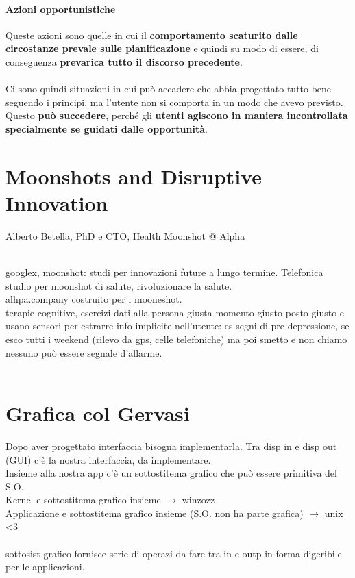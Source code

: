 \documentclass[10pt]{article}
\begin{document}
\paragraph{Azioni opportunistiche} Queste azioni sono quelle in cui il \textbf{comportamento scaturito dalle circostanze prevale sulle pianificazione} e quindi su modo di essere, di conseguenza \textbf{prevarica tutto il discorso precedente}.\\\\Ci sono quindi situazioni in cui può accadere che abbia progettato tutto bene seguendo i principi, ma l'utente non si comporta in un modo che avevo previsto. Questo \textbf{può succedere}, perché gli \textbf{utenti agiscono in maniera incontrollata specialmente se guidati dalle opportunità}.
\section{Moonshots and Disruptive Innovation}
\begin{scriptsize}
Alberto Betella, PhD e CTO, Health Moonshot @ Alpha\\\\
\end{scriptsize}
googlex, moonshot: studi per innovazioni future a lungo termine. Telefonica studio per moonshot di salute, rivoluzionare la salute.\\
alhpa.company costruito per i mooneshot.\\
terapie cognitive, esercizi dati alla persona giusta momento giusto posto giusto e usano sensori per estrarre info implicite nell'utente: es segni di pre-depressione, se esco tutti i weekend (rilevo da gps, celle telefoniche) ma poi smetto e non chiamo nessuno può essere segnale d'allarme.\\\\
\section{Grafica col Gervasi}
Dopo aver progettato interfaccia bisogna implementarla. Tra disp in e disp out (GUI) c'è la nostra interfaccia, da implementare.\\
Insieme alla nostra app c'è un sottostitema grafico che può essere primitiva del S.O.\\
Kernel e sottostitema grafico insieme $\rightarrow$ winzozz\\
Applicazione e sottostitema grafico insieme (S.O. non ha parte grafica) $\rightarrow$ unix <3\\\\
sottosist grafico fornisce serie di operazi da fare tra in e outp in forma digeribile per le applicazioni.
\end{document}
